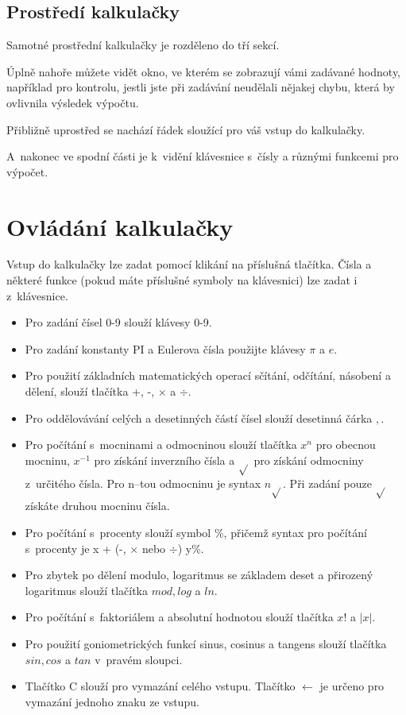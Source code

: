 \documentclass[11pt,a4paper,titlepage]{article}
\begin{document}
	\subsection{Prostředí kalkulačky}

	Samotné prostřední kalkulačky je rozděleno do tří sekcí.

	Úplně nahoře můžete vidět okno, ve kterém se zobrazují vámi zadávané hodnoty, například pro kontrolu, jestli jste při zadávání neudělali nějakej chybu, která by ovlivnila výsledek výpočtu.

	Přibližně uprostřed se nachází řádek sloužící pro váš vstup do kalkulačky.

	A~nakonec ve spodní části je k~vidění klávesnice s~čísly a různými funkcemi pro výpočet.

	\section{Ovládání kalkulačky}

	Vstup do kalkulačky lze zadat pomocí klikání na příslušná tlačítka. Čísla a některé funkce (pokud máte příslušné symboly na klávesnici) lze zadat i z~klávesnice.

	\begin{itemize}
		\item Pro zadání čísel 0-9 slouží klávesy 0-9.
		\item Pro zadání konstanty PI a Eulerova čísla použijte klávesy $\pi$ a $e$.
		\item Pro použití základních matematických operací sčítání, odčítání, násobení a dělení, slouží tlačítka +, -, $\times$ a $\div$.
		\item Pro oddělovávání celých a desetinných částí čísel slouží desetinná čárka $,$.
		\item Pro počítání s~mocninami a odmocninou slouží tlačítka $x^n$ pro obecnou mocninu, $x^{-1}$ pro získání inverzního čísla a $\sqrt{}$ pro získání odmocniny z~určitého čísla. Pro n--tou odmocninu je syntax $n\sqrt{}$. Při zadání pouze $\sqrt{}$ získáte druhou mocninu čísla.
		\item Pro počítání s~procenty slouží symbol \%, přičemž syntax pro počítání s~procenty je x +  (-, $\times$ nebo $\div$) y\%.
		\item Pro zbytek po dělení modulo, logaritmus se základem deset a přirozený logaritmus slouží tlačítka $mod, log$ a $ln$.
		\item Pro počítání s~faktoriálem a absolutní hodnotou slouží tlačítka $x!$ a $|x|$.
		\item Pro použití goniometrických funkcí sinus, cosinus a tangens slouží tlačítka $sin, cos$ a $tan$ v~pravém sloupci.
		\item Tlačítko C slouží pro vymazání celého vstupu. Tlačítko $\leftarrow$ je určeno pro vymazání jednoho znaku ze vstupu.
	\end{itemize}
\end{document}
